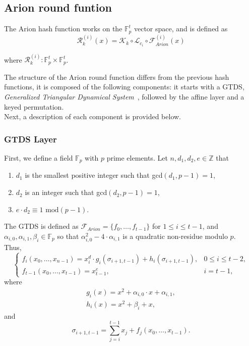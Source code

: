 \subsection*{Arion round funtion}
The Arion hash function works on the $\mathbb{F}_p^t$ vector space, and is defined as
\begin{equation}
    \mathcal{R}_k^{(i)}(x)=\mathcal{K}_k\circ\mathcal{L}_{c_i}\circ\mathcal{F}_{Arion}^{(i)}(x)
\end{equation}

where $\mathcal{R}_k^{(i)}:\mathbb{F}_p^t\times\mathbb{F}_p^t$.

The structure of the Arion round function differs from the previous hash functions, it is composed of the following components: it starts with a GTDS, \textit{Generalized Triangular Dynamical System}~\cite{roy2022generalized}, followed by the affine layer and a keyed permutation.\\
Next, a description of each component is provided below.

\subsubsection*{GTDS Layer}
First, we define a field $\mathbb{F}_p$ with $p$ prime elements. Let $n,d_1,d_2,e\in\mathbb{Z}$ that
\begin{enumerate}
    \item $d_1$ is the smallest positive integer such that gcd$\left(d_1,p-1\right)=1$,
    \item $d_2$ is an integer such that gcd$\left(d_2,p-1\right)=1$,
    \item $e\cdot d_2\equiv1\text{ mod}\left(p-1\right)$. 
\end{enumerate}

The GTDS is defined as $\mathcal{F}_{Arion}=\{f_0,\dots,f_{t-1}\}$ for $1\leq i\leq t-1$, and $\alpha_{i,0},\alpha_{i,1},\beta_i\in\mathbb{F}_p$ so that $\alpha_{i,0}^2-4\cdot\alpha_{i,1}$ is a quadratic non-residue modulo $p$.\\
Thus,
\begin{equation}
    \begin{cases}
        f_i\left(x_0,\dots,x_{n-1}\right)=x_i^d\cdot g_i\left(\sigma_{i+1,t-1}\right)+h_i\left(\sigma_{i+1,t-1}\right), & 0\leq i\leq t-2, \\
        f_{t-1}\left(x_0,\dots,x_{t-1}\right)=x_{t-1}^e, & i=t-1,
    \end{cases}
\end{equation}
where
\begin{align}
    g_i(x)=x^2+\alpha_{i,0}\cdot x+\alpha_{i,1}, \\
    h_i(x)=x^2+\beta_i+x,
\end{align}
and
\begin{equation}
    \sigma_{i+1,t-1}=\sum_{j=i}^{t-1}x_j+f_j\left(x_0,\dots,x_{t-1}\right).
\end{equation}

